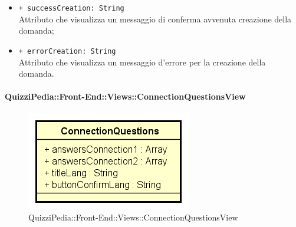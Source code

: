 \begin{itemize}
\begin{itemize}
		\item \texttt{+ successCreation: String} \\ Attributo che visualizza un messaggio di conferma avvenuta creazione della domanda;
		\item \texttt{+ errorCreation: String} \\ Attributo che visualizza un messaggio d'errore per la creazione della domanda.
	\end{itemize}
\end{itemize}


\paragraph{QuizziPedia::Front-End::Views::ConnectionQuestionsView}
\begin{figure} [ht]
	\centering
	\includegraphics[scale=0.45]{UML/Classi/Front-End/QuizziPedia_Front-end_Views_ConnectionQuestionsView.png}
	\caption{QuizziPedia::Front-End::Views::ConnectionQuestionsView}
\end{figure} \FloatBarrier
